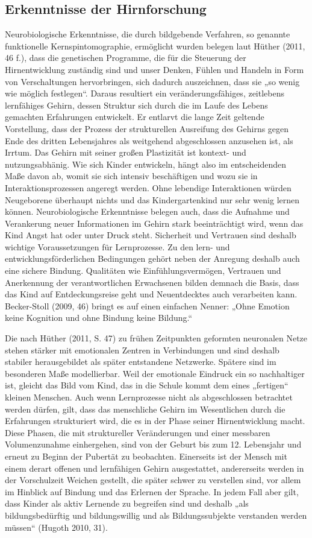 \subsection{Erkenntnisse der Hirnforschung}
Neurobiologische Erkenntnisse, die durch bildgebende Verfahren, so genannte funktionelle Kernspintomographie, ermöglicht wurden
belegen laut Hüther (2011, 46 f.), dass die genetischen Programme, die für die Steuerung der Hirnentwicklung zuständig sind und unser Denken, Fühlen und Handeln in Form von Verschaltungen hervorbringen, sich dadurch auszeichnen, dass sie „so wenig wie möglich festlegen“. Daraus resultiert ein veränderungsfähiges, zeitlebens lernfähiges Gehirn, dessen Struktur sich durch die im Laufe des Lebens gemachten Erfahrungen entwickelt. Er entlarvt die lange Zeit geltende Vorstellung, dass der Prozess der strukturellen Ausreifung des Gehirns gegen Ende des dritten Lebensjahres als weitgehend abgeschlossen anzusehen ist, als Irrtum. Das Gehirn mit seiner großen Plastizität ist kontext- und nutzungsabhänig. Wie sich Kinder entwickeln, hängt also im entscheidenden Maße davon ab, womit sie sich intensiv beschäftigen und wozu sie in Interaktionsprozessen angeregt werden. Ohne lebendige Interaktionen würden Neugeborene überhaupt nichts und das Kindergartenkind nur sehr wenig lernen können. Neurobiologische Erkenntnisse belegen auch, dass die Aufnahme und Verankerung neuer Informationen im Gehirn stark beeinträchtigt wird, wenn das Kind Angst hat oder unter Druck steht. Sicherheit und Vertrauen sind deshalb wichtige Voraussetzungen für Lernprozesse. Zu den lern- und entwicklungsförderlichen Bedingungen gehört neben der Anregung deshalb 
auch eine sichere Bindung. Qualitäten wie Einfühlungsvermögen, Vertrauen und Anerkennung der verantwortlichen Erwachsenen bilden demnach die Basis, dass das Kind auf Entdeckungsreise geht und Neuentdecktes auch verarbeiten kann.
Becker-Stoll (2009, 46) bringt es auf einen einfachen Nenner: „Ohne Emotion keine Kognition und ohne Bindung keine Bildung.“

Die nach Hüther (2011, S. 47) zu frühen Zeitpunkten geformten neuronalen Netze stehen stärker mit emotionalen Zentren in Verbindungen und sind deshalb stabiler herausgebildet als später entstandene Netzwerke. Spätere sind im besonderen Maße modellierbar.
 Weil der emotionale Eindruck ein so nachhaltiger ist, gleicht das Bild vom Kind, das in die Schule kommt dem eines „fertigen“ kleinen Menschen. Auch wenn Lernprozesse nicht als abgeschlossen betrachtet werden dürfen, gilt, dass das menschliche Gehirn im Wesentlichen durch die Erfahrungen strukturiert wird, die es in der Phase seiner Hirnentwicklung macht. 
Diese Phasen, die mit struktureller Veränderungen und einer messbaren Volumenzunahme einhergehen, sind von der Geburt bis zum 12. Lebensjahr und erneut zu Beginn der Pubertät zu beobachten. 
Einerseits ist der Mensch mit einem derart offenen und lernfähigen Gehirn ausgestattet, andererseits werden in der Vorschulzeit Weichen gestellt, die später schwer zu verstellen sind, vor allem im Hinblick auf Bindung und das Erlernen der Sprache.
In jedem Fall aber gilt, dass Kinder als aktiv Lernende zu begreifen sind und deshalb „als bildungsbedürftig und bildungswillig und als Bildungssubjekte verstanden werden müssen“ (Hugoth 2010, 31).
 

